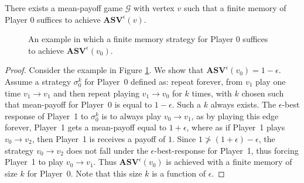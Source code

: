 \begin{theorem}
\label{ThmExNeedFinMem}
There exists a mean-payoff game $\mathcal{G}$ with vertex $v$ such that a finite memory of Player $0$ suffices to achieve $\mathbf{ASV}^{\epsilon}(v)$.
\end{theorem}
\begin{figure}
    \centering
    \caption{An example in which a finite memory strategy for Player $0$ suffices to achieve $\mathbf{ASV}^{\epsilon}(v_0)$.}
    \label{fig:finite_strategy_response}
\end{figure}
\begin{proof}
Consider the example in Figure \ref{fig:finite_strategy_response}. We show that $\mathbf{ASV}^{\epsilon}(v_0) = 1 - \epsilon$. Assume a strategy $\sigma_0^{k}$ for Player~0 defined as: repeat forever, from $v_1$ play one time $v_1 \to v_1$ and then repeat playing $v_1 \to v_0$ for $k$ times, with $k$ chosen such that mean-payoff for Player~0 is equal to $1 - \epsilon$. Such a $k$ always exists. The $\epsilon$-best response of Player~1 to $\sigma_0^{k}$ is to always play $v_0 \to v_1$, as by playing this edge forever, Player~1 gets a mean-payoff equal to $1+\epsilon$, where as if Player~1 plays $v_0 \to v_2$, then Player~1 is receives a payoff of $1$. Since $1 \ngtr (1 + \epsilon) - \epsilon$, the strategy $v_0 \to v_2$ does not fall under the $\epsilon$-best-response for Player~1, thus forcing Player~1 to play $v_0 \to v_1$. Thus $\mathbf{ASV}^{\epsilon}(v_0)$ is achieved with a finite memory of size $k$ for Player~0. Note that this size $k$ is a function of $\epsilon$.
\end{proof}